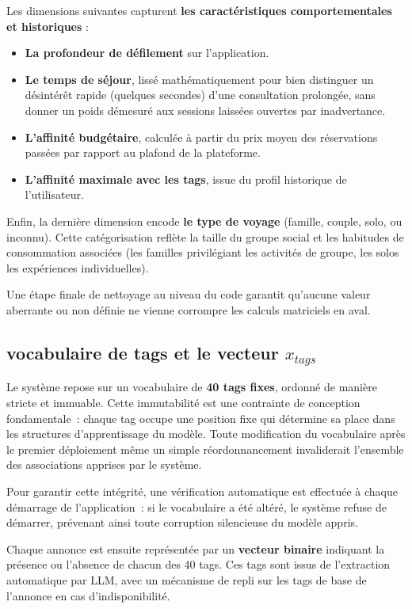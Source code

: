 Les dimensions suivantes capturent \textbf{les caractéristiques comportementales et historiques} :
\begin{itemize}
    \item \textbf{La profondeur de défilement} sur l'application.
    \item \textbf{Le temps de séjour}, lissé mathématiquement pour bien distinguer un désintérêt rapide (quelques secondes) d'une consultation prolongée, sans donner un poids démesuré aux sessions laissées ouvertes par inadvertance.
    \item \textbf{L'affinité budgétaire}, calculée à partir du prix moyen des réservations passées par rapport au plafond de la plateforme.
    \item \textbf{L'affinité maximale avec les tags}, issue du profil historique de l'utilisateur.
\end{itemize}

Enfin, la dernière dimension encode \textbf{le type de voyage} (famille, couple, solo, ou inconnu). Cette catégorisation reflète la taille du groupe social et les habitudes de consommation associées (les familles privilégiant les activités de groupe, les solos les expériences individuelles). 

Une étape finale de nettoyage au niveau du code garantit qu'aucune valeur aberrante ou non définie ne vienne corrompre les calculs matriciels en aval.


\subsection{vocabulaire de tags et le vecteur $x_{tags}$}

Le système repose sur un vocabulaire de \textbf{40 tags fixes}, 
ordonné de manière stricte et immuable. Cette immutabilité est une 
contrainte de conception fondamentale~: chaque tag occupe une position 
fixe qui détermine sa place dans les structures d'apprentissage du 
modèle. Toute modification du vocabulaire après le premier déploiement 
  même un simple réordonnancement   invaliderait l'ensemble des 
associations apprises par le système.

Pour garantir cette intégrité, une vérification automatique est 
effectuée à chaque démarrage de l'application~: si le vocabulaire a 
été altéré, le système refuse de démarrer, prévenant ainsi toute 
corruption silencieuse du modèle appris.

Chaque annonce est ensuite représentée par un \textbf{vecteur binaire} 
indiquant la présence ou l'absence de chacun des 40 tags. Ces tags 
sont issus de l'extraction automatique par LLM, avec un mécanisme de 
repli sur les tags de base de l'annonce en cas d'indisponibilité.


